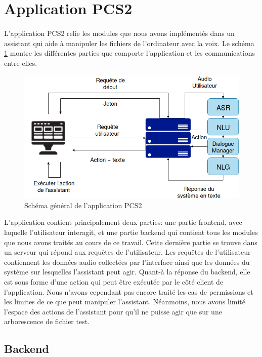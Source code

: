 \section{Application PCS2}
\paragraph{}L'application PCS2 relie les modules que nous avons implémentés dans un assistant qui aide à manipuler les fichiers de l'ordinateur avec la voix. Le schéma \ref{schema_app} montre les différentes parties que comporte l'application et les communications entre elles.
\begin{figure}[H] 
	\centering
	\includegraphics[width=0.95\linewidth]{images/Realisation/schema_app.png}
	\caption{Schéma général de l'application PCS2}\label{schema_app}
\end{figure}
\par L'application contient principalement deux parties: une partie frontend, avec laquelle l'utilisateur interagit, et une partie backend qui contient tous les modules que nous avons traités au cours de ce travail. Cette dernière partie se trouve dans un serveur qui répond aux requêtes de l'utilisateur. Les requêtes de l'utilisateur contiennent les données audio collectées par l'interface ainsi que les données du système sur lesquelles l'assistant peut agir. Quant-à la réponse du backend, elle est sous forme d'une action qui peut être exécutée par le côté client de l'application. Nous n'avons cependant pas encore traité les cas de permissions et les limites de ce que peut manipuler l'assistant. Néanmoins, nous avons limité l'espace des actions de l'assistant pour qu'il ne puisse agir que sur une arborescence de fichier test.
\subsection{Backend}
